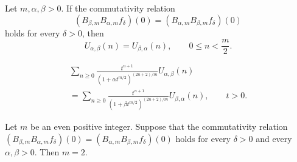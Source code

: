 \documentclass[10pt,a4paper]{amsart}
\begin{document}
\begin{lemma}\label{l1} Let $m,\alpha,\beta>0$. If the commutativity relation 
$$ 
(B_{\beta,m}B_{\alpha,m}f_\delta)(0)=(B_{\alpha,m} B_{\beta,m}f_\delta)(0)
$$
holds for every $\delta>0$, then 
\begin{equation}
U_{\alpha,\beta}(n)=U_{\beta,\alpha}(n),\qquad 0\le n<\frac{m}2.
\label{e8}
\end{equation}
\label{lem1}
\end{lemma}

\begin{multline}
\sum_{n\ge 0} \frac{t^{n+1}}{(1+\alpha t^{m/2})^{(2n+2)/m}}U_{\alpha,\beta}(n)\\=\sum_{n\ge 0} \frac{t^{n+1}}{(1+\beta t^{m/2})^{(2n+2)/m}}U_{\beta,\alpha}(n),\qquad t>0.
\label{e4}
\end{multline}

\begin{lemma}\label{moments} Let $m$ be an even positive integer. Suppose that the commutativity relation $(B_{\beta,m}B_{\alpha,m}f_\delta)(0)=(B_{\alpha,m}B_{\beta,m}f_\delta)(0)$
holds for every $\delta>0$ and every $\alpha,\beta>0$. Then $m=2$. 
\end{lemma}
\end{document}
